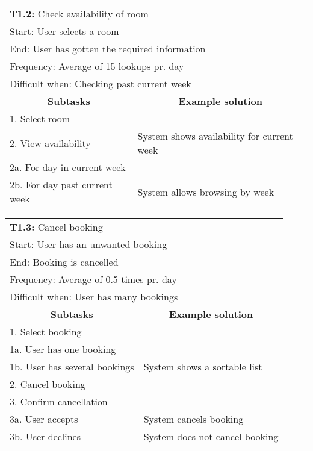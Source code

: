 \begin{tabular}{|p{6cm}|p{6cm}|}
\hline 
	\multicolumn{2}{|l|}{\textbf{T1.2:} \hspace{26mm}Check availability of room} \\
	\multicolumn{2}{|l|}{Start: \hspace{26mm}User selects a room } \\
	\multicolumn{2}{|l|}{End: \hspace{28mm}User has gotten the required information } \\
	\multicolumn{2}{|l|}{Frequency: \hspace{17mm}Average of 15 lookups pr. day} \\
	\multicolumn{2}{|l|}{Difficult when: \hspace{10mm}Checking past current week } \\ \hline
	\multicolumn{1}{|c|}{\textbf{Subtasks}} & \multicolumn{1}{c|}{\textbf{Example solution}} \\ \hline
	1.  Select room & \\ \hline
	2.  View availability & System shows availability for current week\\
	2a. For day in current week & \\
	2b. For day past current week & System allows browsing by week \\ \hline
\end{tabular}

\begin{tabular}{|p{6cm}|p{6cm}|}
\hline 
	\multicolumn{2}{|l|}{\textbf{T1.3:} \hspace{26mm}Cancel booking} \\
	\multicolumn{2}{|l|}{Start: \hspace{26mm}User has an unwanted booking } \\
	\multicolumn{2}{|l|}{End: \hspace{28mm}Booking is cancelled } \\
	\multicolumn{2}{|l|}{Frequency: \hspace{17mm}Average of 0.5 times pr. day} \\
	\multicolumn{2}{|l|}{Difficult when: \hspace{10mm}User has many bookings } \\ \hline
	\multicolumn{1}{|c|}{\textbf{Subtasks}} & \multicolumn{1}{c|}{\textbf{Example solution}} \\ \hline
	1.  Select booking & \\
	1a. User has one booking & \\
	1b. User has several bookings & System shows a sortable list \\ \hline
	2.  Cancel booking & \\ \hline
	3. Confirm cancellation & \\
	3a. User accepts & System cancels booking \\
	3b. User declines & System does not cancel booking \\ \hline
\end{tabular}


